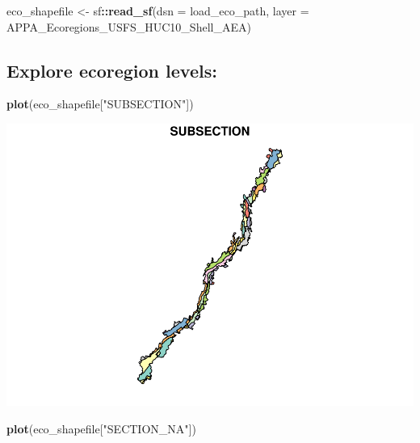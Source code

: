 \documentclass[
]{book}
\newenvironment{Shaded}{\begin{snugshade}}{\end{snugshade}}
\newcommand{\AttributeTok}[1]{\textcolor[rgb]{0.13,0.29,0.53}{#1}}
\newcommand{\FunctionTok}[1]{\textcolor[rgb]{0.13,0.29,0.53}{\textbf{#1}}}
\newcommand{\NormalTok}[1]{#1}
\newcommand{\OtherTok}[1]{\textcolor[rgb]{0.56,0.35,0.01}{#1}}
\newcommand{\SpecialCharTok}[1]{\textcolor[rgb]{0.81,0.36,0.00}{\textbf{#1}}}
\newcommand{\StringTok}[1]{\textcolor[rgb]{0.31,0.60,0.02}{#1}}
\begin{document}
\begin{Shaded}
\begin{Highlighting}[]
\NormalTok{eco\_shapefile }\OtherTok{\textless{}{-}}\NormalTok{ sf}\SpecialCharTok{::}\FunctionTok{read\_sf}\NormalTok{(}\AttributeTok{dsn =}\NormalTok{ load\_eco\_path, }
                   \AttributeTok{layer =} \StringTok{\textquotesingle{}APPA\_Ecoregions\_USFS\_HUC10\_Shell\_AEA\textquotesingle{}}\NormalTok{)}
\end{Highlighting}
\end{Shaded}

\hypertarget{explore-ecoregion-levels}{%
\subsection{Explore ecoregion levels:}\label{explore-ecoregion-levels}}

\begin{Shaded}
\begin{Highlighting}[]
\FunctionTok{plot}\NormalTok{(eco\_shapefile[}\StringTok{"SUBSECTION"}\NormalTok{])}
\end{Highlighting}
\end{Shaded}

\includegraphics{_main_files/figure-latex/eco-subsections-1.pdf}

\begin{Shaded}
\begin{Highlighting}[]
\FunctionTok{plot}\NormalTok{(eco\_shapefile[}\StringTok{"SECTION\_NA"}\NormalTok{])}
\end{Highlighting}
\end{Shaded}
\end{document}
